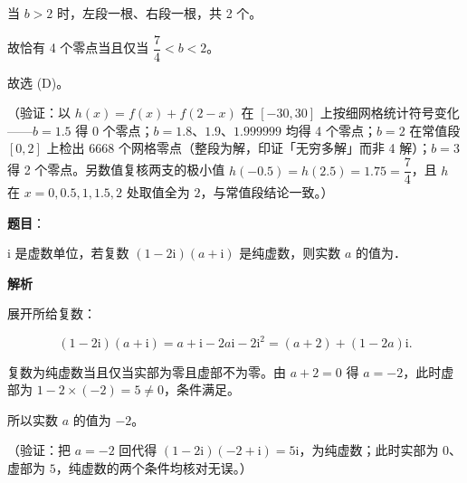 \begin{answer}
当 \(b>2\) 时，左段一根、右段一根，共 2 个。

故恰有 4 个零点当且仅当 \(\dfrac{7}{4}<b<2\)。

故选 (D)。

（验证：以 \(h(x)=f(x)+f(2-x)\) 在 \([-30,30]\) 上按细网格统计符号变化——\(b=1.5\) 得 0 个零点；\(b=1.8\)、\(1.9\)、\(1.999999\) 均得 4 个零点；\(b=2\) 在常值段 \([0,2]\) 上检出 6668 个网格零点（整段为解，印证「无穷多解」而非 4 解）；\(b=3\) 得 2 个零点。另数值复核两支的极小值 \(h(-0.5)=h(2.5)=1.75=\dfrac{7}{4}\)，且 \(h\) 在 \(x=0,0.5,1,1.5,2\) 处取值全为 \(2\)，与常值段结论一致。）


\end{answer}
\begin{answer}

\textbf{题目}：

\(\mathrm{i}\) 是虚数单位，若复数 \((1-2\mathrm{i})(a+\mathrm{i})\) 是纯虚数，则实数 \(a\) 的值为\gkblank{}．

\textbf{解析}

展开所给复数：

\nopagebreak[4]
\[
(1-2\mathrm{i})(a+\mathrm{i})=a+\mathrm{i}-2a\mathrm{i}-2\mathrm{i}^2=(a+2)+(1-2a)\mathrm{i}.
\]

复数为纯虚数当且仅当实部为零且虚部不为零。由 \(a+2=0\) 得 \(a=-2\)，此时虚部为 \(1-2\times(-2)=5\neq0\)，条件满足。

所以实数 \(a\) 的值为 \(-2\)。

（验证：把 \(a=-2\) 回代得 \((1-2\mathrm{i})(-2+\mathrm{i})=5\mathrm{i}\)，为纯虚数；此时实部为 \(0\)、虚部为 \(5\)，纯虚数的两个条件均核对无误。）


\end{answer}
